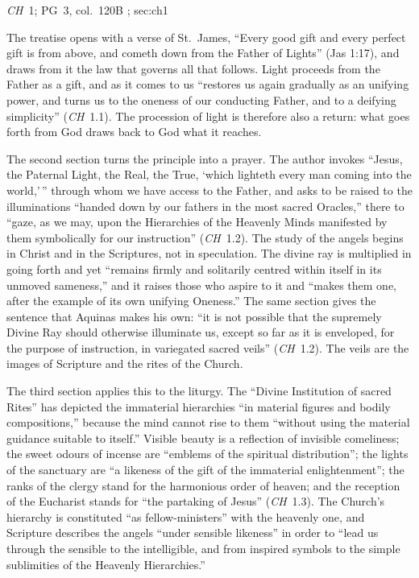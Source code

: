 {\emph{CH}~1; PG~3, col.~120B}
{; }{sec:ch1}

The treatise opens with a verse of St.~James, ``Every good gift and every
perfect gift is from above, and cometh down from the Father of Lights''
(Jas 1:17), and draws from it the law that governs all that follows.
Light proceeds from the Father as a gift, and as it comes to us ``restores
us again gradually as an unifying power, and turns us to the oneness of
our conducting Father, and to a deifying simplicity'' (\emph{CH}~1.1).
The procession of light is therefore also a return: what goes forth from
God draws back to God what it reaches.

The second section turns the principle into a prayer. The author invokes
``Jesus, the Paternal Light, the Real, the True, `which lighteth every man
coming into the world,'\,'' through whom we have access to the Father, and
asks to be raised to the illuminations ``handed down by our fathers in
the most sacred Oracles,'' there to ``gaze, as we may, upon the
Hierarchies of the Heavenly Minds manifested by them symbolically for our
instruction'' (\emph{CH}~1.2). The study of the angels begins in Christ
and in the Scriptures, not in speculation. The divine ray is multiplied
in going forth and yet ``remains firmly and solitarily centred within
itself in its unmoved sameness,'' and it raises those who aspire to it
and ``makes them one, after the example of its own unifying Oneness.''
The same section gives the sentence that Aquinas makes his own: ``it is
not possible that the supremely Divine Ray should otherwise illuminate
us, except so far as it is enveloped, for the purpose of instruction, in
variegated sacred veils'' (\emph{CH}~1.2). The veils are the images of
Scripture and the rites of the Church.

The third section applies this to the liturgy. The ``Divine Institution
of sacred Rites'' has depicted the immaterial hierarchies ``in material
figures and bodily compositions,'' because the mind cannot rise to them
``without using the material guidance suitable to itself.'' Visible
beauty is a reflection of invisible comeliness; the sweet odours of
incense are ``emblems of the spiritual distribution''; the lights of the
sanctuary are ``a likeness of the gift of the immaterial enlightenment'';
the ranks of the clergy stand for the harmonious order of heaven; and the
reception of the Eucharist stands for ``the partaking of Jesus''
(\emph{CH}~1.3). The Church's hierarchy is constituted ``as
fellow-ministers'' with the heavenly one, and Scripture describes the
angels ``under sensible likeness'' in order to ``lead us through the
sensible to the intelligible, and from inspired symbols to the simple
sublimities of the Heavenly Hierarchies.''

